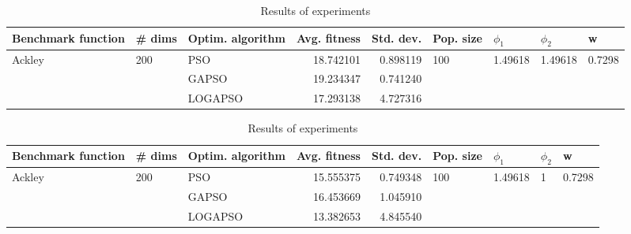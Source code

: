 \documentclass{article}
\begin{document}
\begin{table}
\centering
\caption{Results of experiments}
\begin{tabular}{lllrrllll}
\toprule
     Benchmark function &              \# dims & Optim. algorithm &  Avg. fitness &  Std. dev. &            Pop. size &               $\phi_{1}$ &               $\phi_{2}$ &                       w \\
\midrule
\multirow{3}{*}{Ackley} & \multirow{3}{*}{200} &              PSO &     18.742101 &   0.898119 & \multirow{3}{*}{100} & \multirow{3}{*}{1.49618} & \multirow{3}{*}{1.49618} & \multirow{3}{*}{0.7298} \\
                        &                      &            GAPSO &     19.234347 &   0.741240 &                      &                          &                          &                         \\
                        &                      &          LOGAPSO &     17.293138 &   4.727316 &                      &                          &                          &                         \\
\bottomrule
\end{tabular}
\end{table}
\begin{table}
\centering
\caption{Results of experiments}
\begin{tabular}{lllrrllll}
\toprule
     Benchmark function &              \# dims & Optim. algorithm &  Avg. fitness &  Std. dev. &            Pop. size &               $\phi_{1}$ &         $\phi_{2}$ &                       w \\
\midrule
\multirow{3}{*}{Ackley} & \multirow{3}{*}{200} &              PSO &     15.555375 &   0.749348 & \multirow{3}{*}{100} & \multirow{3}{*}{1.49618} & \multirow{3}{*}{1} & \multirow{3}{*}{0.7298} \\
                        &                      &            GAPSO &     16.453669 &   1.045910 &                      &                          &                    &                         \\
                        &                      &          LOGAPSO &     13.382653 &   4.845540 &                      &                          &                    &                         \\
\bottomrule
\end{tabular}
\end{table}
\end{document}
